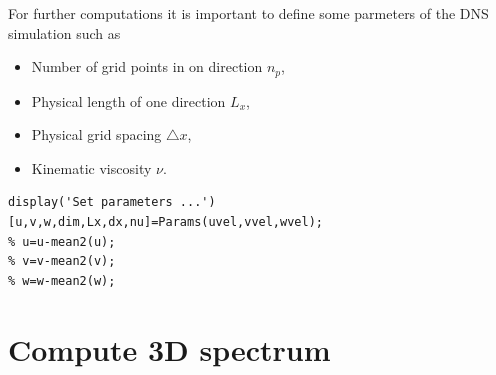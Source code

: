 \documentclass[preprint,12pt,ntfdMod]{elsarticle}
\begin{document}
\begin{par}

For further computations it is important to define some parmeters of the
DNS simulation such as
\begin{itemize}
  \item Number of grid points in on direction $n_{p}$,
  \item Physical length of one direction $L_x$,
  \item Physical grid spacing $\triangle x$,
  \item Kinematic viscosity $\nu$.
\end{itemize}

\end{par} \vspace{1em}
\begin{lstlisting}
display('Set parameters ...')
[u,v,w,dim,Lx,dx,nu]=Params(uvel,vvel,wvel);
% u=u-mean2(u);
% v=v-mean2(v);
% w=w-mean2(w);
\end{lstlisting}
\begin{par}



\end{par} \vspace{1em}


\section{Compute 3D spectrum}
\end{document}
